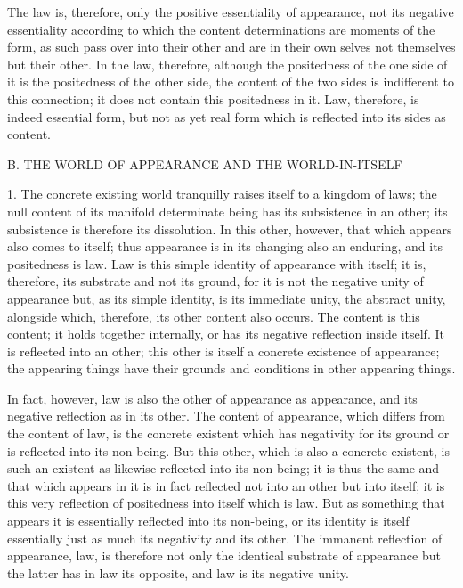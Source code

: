 The law is, therefore, only
the positive essentiality of appearance,
not its negative essentiality according to which
the content determinations are moments of the form,
as such pass over into their other
and are in their own selves
not themselves but their other.
In the law, therefore, although
the positedness of the one side of it is
the positedness of the other side,
the content of the two sides is
indifferent to this connection;
it does not contain this positedness in it.
Law, therefore, is indeed essential form,
but not as yet real form which is reflected
into its sides as content.

B. THE WORLD OF APPEARANCE AND THE WORLD-IN-ITSELF

1. The concrete existing world tranquilly
raises itself to a kingdom of laws;
the null content of its manifold determinate being
has its subsistence in an other;
its subsistence is therefore its dissolution.
In this other, however, that which appears also comes to itself;
thus appearance is in its changing also an enduring,
and its positedness is law.
Law is this simple identity of appearance with itself;
it is, therefore, its substrate and not its ground,
for it is not the negative unity of appearance
but, as its simple identity, is its immediate unity,
the abstract unity, alongside which, therefore,
its other content also occurs.
The content is this content; it holds together internally,
or has its negative reflection inside itself.
It is reflected into an other;
this other is itself a concrete existence of appearance;
the appearing things have their grounds and conditions
in other appearing things.

In fact, however, law is also
the other of appearance as appearance,
and its negative reflection as in its other.
The content of appearance,
which differs from the content of law,
is the concrete existent
which has negativity for its ground
or is reflected into its non-being.
But this other, which is also a concrete existent,
is such an existent as likewise reflected into its non-being;
it is thus the same and that which appears in it
is in fact reflected not into an other but into itself;
it is this very reflection of positedness into itself
which is law.
But as something that appears
it is essentially reflected into its non-being,
or its identity is itself essentially
just as much its negativity and its other.
The immanent reflection of appearance,
law, is therefore not only
the identical substrate of appearance
but the latter has in law its opposite,
and law is its negative unity.

